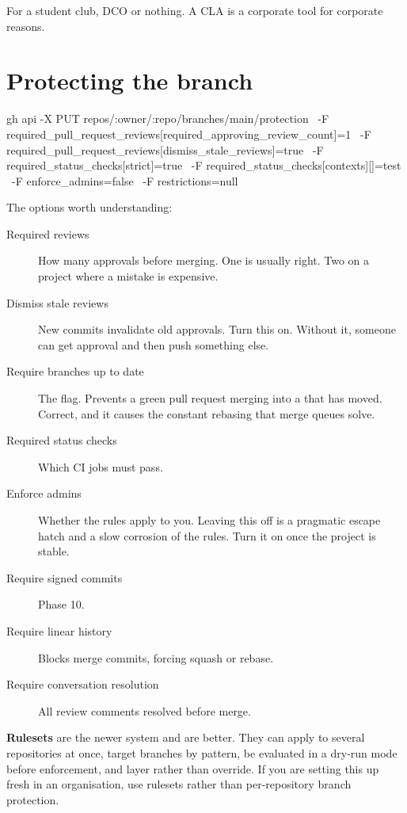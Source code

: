 \documentclass[11pt]{article}
\begin{document}
For a student club, DCO or nothing. A CLA is a corporate tool for corporate reasons.

\section{Protecting the branch}

\begin{shell}
gh api -X PUT repos/:owner/:repo/branches/main/protection \
  -F required_pull_request_reviews[required_approving_review_count]=1 \
  -F required_pull_request_reviews[dismiss_stale_reviews]=true \
  -F required_status_checks[strict]=true \
  -F required_status_checks[contexts][]=test \
  -F enforce_admins=false \
  -F restrictions=null
\end{shell}

The options worth understanding:

\begin{description}
  \item[Required reviews] How many approvals before merging. One is usually right.
    Two on a project where a mistake is expensive.
  \item[Dismiss stale reviews] New commits invalidate old approvals. Turn this on.
    Without it, someone can get approval and then push something else.
  \item[Require branches up to date] The  flag. Prevents a green pull
    request merging into a  that has moved. Correct, and it causes the
    constant rebasing that merge queues solve.
  \item[Required status checks] Which CI jobs must pass.
  \item[Enforce admins] Whether the rules apply to you. Leaving this off is a
    pragmatic escape hatch and a slow corrosion of the rules. Turn it on once the
    project is stable.
  \item[Require signed commits] Phase 10.
  \item[Require linear history] Blocks merge commits, forcing squash or rebase.
  \item[Require conversation resolution] All review comments resolved before merge.
\end{description}

\begin{note}
\textbf{Rulesets} are the newer system and are better. They can apply to several
repositories at once, target branches by pattern, be evaluated in a dry-run mode
before enforcement, and layer rather than override. If you are setting this up fresh
in an organisation, use rulesets rather than per-repository branch protection.
\end{note}
\end{document}
